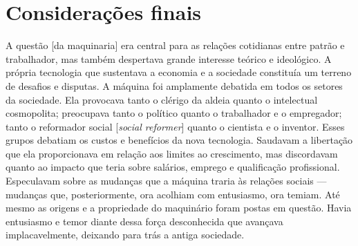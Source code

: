 
\chapter{Considerações finais}

\setlength{\epigraphwidth}{0.9\textwidth}

\epigraph{A questão [da maquinaria] era central para as relações cotidianas entre patrão e trabalhador, mas também despertava grande interesse teórico e ideológico. A própria tecnologia que sustentava a economia e a sociedade constituía um terreno de desafios e disputas. A máquina foi amplamente debatida em todos os setores da sociedade. Ela provocava tanto o clérigo da aldeia quanto o intelectual cosmopolita; preocupava tanto o político quanto o trabalhador e o empregador; tanto o reformador social [\textit{social reformer}] quanto o cientista e o inventor. Esses grupos debatiam os custos e benefícios da nova tecnologia. Saudavam a libertação que ela proporcionava em relação aos limites ao crescimento, mas discordavam quanto ao impacto que teria sobre salários, emprego e qualificação profissional. Especulavam sobre as mudanças que a máquina traria às relações sociais — mudanças que, posteriormente, ora acolhiam com entusiasmo, ora temiam. Até mesmo as origens e a propriedade do maquinário foram postas em questão. Havia entusiasmo e temor diante dessa força desconhecida que avançava implacavelmente, deixando para trás a antiga sociedade.}{\parencite[Berg \textit{apud}][p. 80-1]{Pasquinelli2023}}